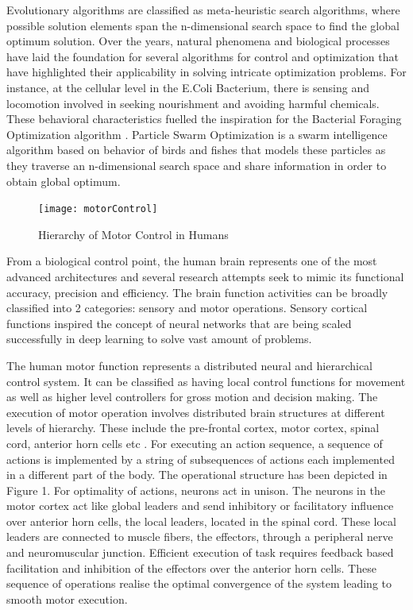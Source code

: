 \documentclass[a4paper,twoside]{article}
\begin{document}
Evolutionary algorithms are classified as meta-heuristic search algorithms, where possible solution elements span the n-dimensional search space to find the global optimum solution. Over the years, natural phenomena and biological processes have laid the foundation for several algorithms for control and optimization that have highlighted their applicability in solving intricate optimization problems. For instance, at the cellular level in the E.Coli Bacterium, there is sensing and locomotion involved in seeking nourishment and avoiding harmful chemicals. These behavioral characteristics fuelled the inspiration for the Bacterial Foraging Optimization algorithm \cite{passino2002biomimicry}\cite{onwubolu2013new}. 
Particle Swarm Optimization \cite{kennedy2011particle} is a swarm intelligence algorithm based on behavior of birds and fishes that models these particles as they traverse an n-dimensional search space and share information in order to obtain global optimum.
\begin{figure}[b!]
  \texttt{[image: motorControl]}
  \caption{Hierarchy of Motor Control in Humans}
  \label{fig:motorControl}
\end{figure}
From a biological control point, the human brain represents one of the most advanced architectures and several research attempts seek to mimic its functional accuracy, precision and efficiency. The brain function activities can be broadly classified into 2 categories: sensory and motor operations. Sensory cortical functions inspired the concept of neural networks that are being scaled successfully in deep learning to solve vast amount of problems.


The human motor function represents a distributed neural and hierarchical control system. It can be classified as having local control functions for movement as well as higher level controllers for gross motion and decision making. The execution of motor operation involves distributed brain structures at different levels of hierarchy. These include the pre-frontal cortex, motor cortex, spinal cord, anterior horn cells etc \cite{Shaw1982119}. For executing an action sequence, a sequence of actions is implemented by a string of subsequences of actions each implemented in a different part of the body. The operational structure has been depicted in Figure 1\cite{passino2005biomimicry}.
For optimality of actions, neurons act in unison. The neurons in the motor cortex act like global leaders and send inhibitory or facilitatory influence over anterior horn cells, the local leaders, located in the spinal cord\cite{Shaw1982119}. These local leaders are connected to muscle fibers, the effectors, through a peripheral nerve and neuromuscular junction.
Efficient execution of task requires feedback based facilitation and inhibition of the effectors over the anterior horn cells. These sequence of operations realise the optimal convergence of the system leading to smooth motor execution.
\end{document}
